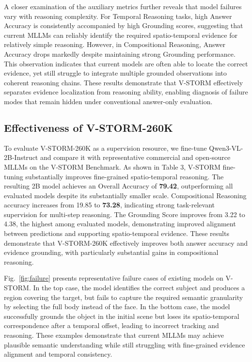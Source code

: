 \documentclass[letterpaper]{article} %
\begin{document}
A closer examination of the auxiliary metrics further reveals that model failures vary with reasoning complexity. For Temporal Reasoning tasks, high Answer Accuracy is consistently accompanied by high Grounding scores, suggesting that current MLLMs can reliably identify the required spatio-temporal evidence for relatively simple reasoning. However, in Compositional Reasoning, Answer Accuracy drops markedly despite maintaining strong Grounding performance. This observation indicates that current models are often able to locate the correct evidence, yet still struggle to integrate multiple grounded observations into coherent reasoning chains. These results demonstrate that V-STORM effectively separates evidence localization from reasoning ability, enabling diagnosis of failure modes that remain hidden under conventional answer-only evaluation.

\subsection{Effectiveness of V-STORM-260K}
To evaluate V-STORM-260K as a supervision resource, we fine-tune Qwen3-VL-2B-Instruct and compare it with representative commercial and open-source MLLMs on the V-STORM Benchmark. As shown in Table 3, V-STORM fine-tuning substantially improves fine-grained spatio-temporal reasoning. The resulting 2B model achieves an Overall Accuracy of \textbf{79.42}, outperforming all evaluated models despite its substantially smaller scale. Compositional Reasoning accuracy increases from 19.85 to \textbf{73.28}, indicating strong task-relevant supervision for multi-step reasoning. The Grounding Score improves from 3.22 to 4.38, the highest among evaluated models, demonstrating improved alignment between predictions and supporting spatio-temporal evidence. These results demonstrate that V-STORM-260K effectively improves both answer accuracy and evidence grounding, with particularly substantial gains in compositional reasoning.

Fig.~\ref{fig:failure} presents representative failure cases of existing models on V-STORM. 
In the top case, the model identifies the correct subject and produces a region covering the target, but fails to capture the required semantic granularity by selecting the full body instead of the face. 
In the bottom case, the model successfully grounds the object in the initial scene but loses its spatio-temporal correspondence after a temporal offset, leading to incorrect tracking and reasoning. 
These examples demonstrate that current MLLMs may achieve plausible semantic understanding while still struggling with fine-grained evidence alignment and temporal consistency.
\end{document}
